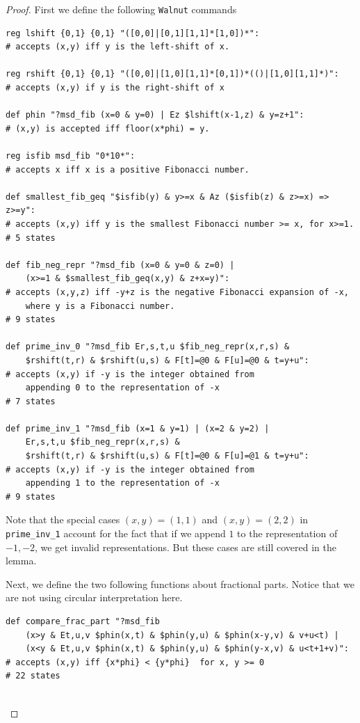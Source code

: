 \documentclass[12pt,runningheads]{llncs}
\begin{document}
\begin{proof}%
First we define the following {\tt Walnut} commands
\begin{verbatim}
reg lshift {0,1} {0,1} "([0,0]|[0,1][1,1]*[1,0])*":
# accepts (x,y) iff y is the left-shift of x.

reg rshift {0,1} {0,1} "([0,0]|[1,0][1,1]*[0,1])*(()|[1,0][1,1]*)":
# accepts (x,y) if y is the right-shift of x

def phin "?msd_fib (x=0 & y=0) | Ez $lshift(x-1,z) & y=z+1":
# (x,y) is accepted iff floor(x*phi) = y.

reg isfib msd_fib "0*10*":
# accepts x iff x is a positive Fibonacci number.

def smallest_fib_geq "$isfib(y) & y>=x & Az ($isfib(z) & z>=x) => z>=y":
# accepts (x,y) iff y is the smallest Fibonacci number >= x, for x>=1.
# 5 states

def fib_neg_repr "?msd_fib (x=0 & y=0 & z=0) | 
    (x>=1 & $smallest_fib_geq(x,y) & z+x=y)":
# accepts (x,y,z) iff -y+z is the negative Fibonacci expansion of -x,
    where y is a Fibonacci number.
# 9 states

def prime_inv_0 "?msd_fib Er,s,t,u $fib_neg_repr(x,r,s) &
    $rshift(t,r) & $rshift(u,s) & F[t]=@0 & F[u]=@0 & t=y+u":
# accepts (x,y) if -y is the integer obtained from 
    appending 0 to the representation of -x
# 7 states

def prime_inv_1 "?msd_fib (x=1 & y=1) | (x=2 & y=2) |
    Er,s,t,u $fib_neg_repr(x,r,s) &
    $rshift(t,r) & $rshift(u,s) & F[t]=@0 & F[u]=@1 & t=y+u":
# accepts (x,y) if -y is the integer obtained from 
    appending 1 to the representation of -x
# 9 states
\end{verbatim}

Note that the special cases $(x,y)=(1,1)$ and $(x,y) = (2,2)$ in {\tt prime\_inv\_1} account for the
fact that if we append $1$ to the representation of $-1, -2$, we get invalid representations. But these cases are still covered in the lemma.

Next, we define the two following functions about fractional parts. Notice that we are not using circular interpretation here. 

\begin{verbatim}
def compare_frac_part "?msd_fib 
    (x>y & Et,u,v $phin(x,t) & $phin(y,u) & $phin(x-y,v) & v+u<t) | 
    (x<y & Et,u,v $phin(x,t) & $phin(y,u) & $phin(y-x,v) & u<t+1+v)":
# accepts (x,y) iff {x*phi} < {y*phi}  for x, y >= 0 
# 22 states


\end{verbatim}
\end{proof}
\end{document}
